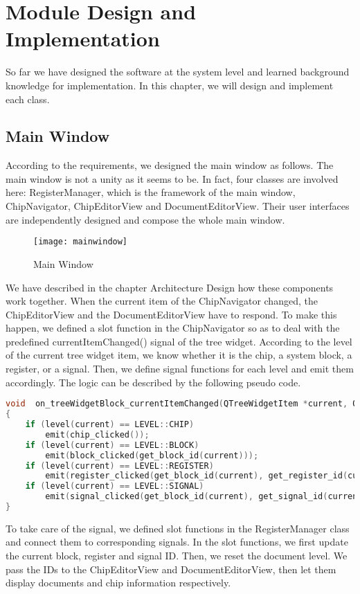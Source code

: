 \chapter{Module Design and Implementation}
So far we have designed the software at the system level and learned background knowledge for implementation. In this chapter, we will design and implement each class.

\section{Main Window}
According to the requirements, we designed the main window as follows. The main window is not a unity as it seems to be. In fact, four classes are involved here: RegisterManager, which is the framework of the main window, ChipNavigator, ChipEditorView and DocumentEditorView. Their user interfaces are independently designed and compose the whole main window.

\begin{figure}[htbp]
\centering
\texttt{[image: mainwindow]}
\caption{Main Window\label{fig:Main Window}}
\end{figure}

We have described in the chapter Architecture Design how these components work together. When the current item of the ChipNavigator changed, the ChipEditorView and the DocumentEditorView have to respond. To make this happen, we defined a slot function in the ChipNavigator so as to deal with the predefined currentItemChanged() signal of the tree widget. According to the level of the current tree widget item, we know whether it is the chip, a system block, a register, or a signal. Then, we define signal functions for each level and emit them accordingly. The logic can be described by the following pseudo code.

\begin{lstlisting}[language=C++]
void  on_treeWidgetBlock_currentItemChanged(QTreeWidgetItem *current, QTreeWidgetItem *previous)
{
    if (level(current) == LEVEL::CHIP) 
        emit(chip_clicked());
    if (level(current) == LEVEL::BLOCK) 
        emit(block_clicked(get_block_id(current)));
    if (level(current) == LEVEL::REGISTER) 
        emit(register_clicked(get_block_id(current), get_register_id(current)));
    if (level(current) == LEVEL::SIGNAL) 
        emit(signal_clicked(get_block_id(current), get_signal_id(current)));
}
\end{lstlisting}

To take care of the signal, we defined slot functions in the RegisterManager class and connect them to corresponding signals. In the slot functions, we first update the current block, register and signal ID. Then, we reset the document level. We pass the IDs to the ChipEditorView and DocumentEditorView, then let them display documents and chip information respectively.

